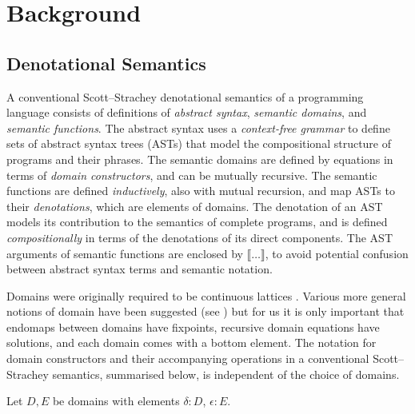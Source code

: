 \section{Background}\label{Background-background}

\subsection{Denotational Semantics}\label{Background-denotational-semantics}

A conventional Scott--Strachey denotational semantics of a programming
language consists of definitions of \emph{abstract syntax},
\emph{semantic domains}, and \emph{semantic functions}. The abstract
syntax uses a \emph{context-free grammar} to define sets of abstract
syntax trees (ASTs) that model the compositional structure of programs
and their phrases. The semantic domains are defined by equations in
terms of \emph{domain constructors}, and can be mutually recursive. The
semantic functions are defined \emph{inductively}, also with mutual
recursion, and map ASTs to their \emph{denotations}, which are elements
of domains. The denotation of an AST models its contribution to the
semantics of complete programs, and is defined \emph{compositionally} in
terms of the denotations of its direct components. The AST arguments of
semantic functions are enclosed by \(\llbracket\dots\rrbracket\), to
avoid potential confusion between abstract syntax terms and semantic
notation.

Domains were originally required to be continuous lattices
\cite{Scott1970OMT,Scott1972CL,Stoy1977DSS,Tennent1976DSP}.
Various more general notions of domain have been suggested (see
\cite{Abramsky1995DT})
but for us it is only important that endomaps between domains have
fixpoints, recursive domain equations have solutions, and each domain
comes with a bottom element. The notation for domain constructors and
their accompanying operations in a conventional Scott--Strachey
semantics, summarised below, is independent of the choice of domains.

Let \(D, E\) be domains with elements \(\delta : D\), \(\epsilon : E\).

